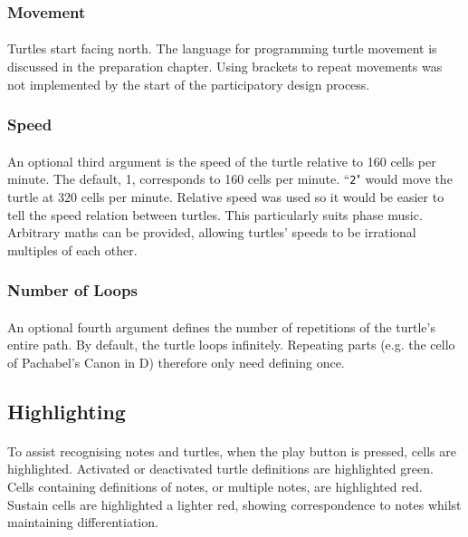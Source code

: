 \subsubsection{Movement}

\paragraph{} Turtles start facing north. The language for programming turtle movement is discussed in the preparation chapter. Using brackets to repeat movements was not implemented by the start of the participatory design process.

\subsubsection{Speed}

\paragraph{} An optional third argument is the speed of the turtle relative to 160 cells per minute. The default, 1, corresponds to 160 cells per minute. ``\texttt{2}" would move the turtle at 320 cells per minute. Relative speed was used so it would be easier to tell the speed relation between turtles. This particularly suits phase music. Arbitrary maths can be provided, allowing turtles' speeds to be irrational multiples of each other.

\subsubsection{Number of Loops}

\paragraph{} An optional fourth argument defines the number of repetitions of the turtle's entire path. By default, the turtle loops infinitely. Repeating parts (e.g. the cello  of Pachabel's Canon in D) therefore only need defining once.

\subsection{Highlighting}

\paragraph{} To assist recognising notes and turtles, when the play button is pressed, cells are highlighted. Activated or deactivated turtle definitions are highlighted green. Cells containing definitions of notes, or multiple notes, are highlighted red. Sustain cells are highlighted a lighter red, showing correspondence to notes whilst maintaining differentiation.

